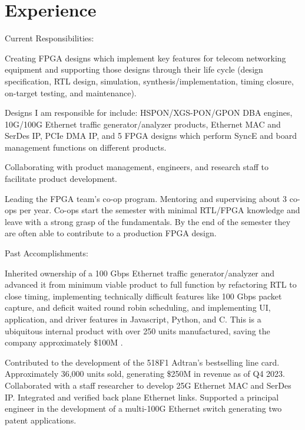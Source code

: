 \documentclass[10pt]{deedy-resume-reversed}
\begin{document}
\begin{minipage}[t]{1.0\textwidth}
\section{Experience}
Current Responsibilities:
\vspace{\topsep} %
\begin{tightemize}
\item Creating FPGA designs which implement key features for telecom networking equipment and 
supporting those designs through their life cycle (design specification, RTL design, simulation, 
synthesis/implementation, timing closure, on-target testing, and maintenance).
\item Designs I am responsible for include: HSPON/XGS-PON/GPON DBA engines, 
10G/100G Ethernet traffic generator/analyzer products, 
Ethernet MAC and SerDes IP, PCIe DMA IP, and 5 FPGA designs which perform SyncE and board management functions on different products.
\item Collaborating with product management, engineers, and research staff to facilitate product development.
\item Leading the FPGA team's co-op program. Mentoring and supervising about 3 co-ops per year. 
Co-ops start the semester with minimal RTL/FPGA knowledge and leave with a strong grasp of 
the fundamentals. By the end of the semester they are often able to contribute to a production FPGA design.
\end{tightemize}
Past Accomplishments:
\begin{tightemize}
\item Inherited ownership of a 100 Gbps Ethernet traffic generator/analyzer and advanced it from minimum viable product to full function by refactoring RTL to close timing, 
implementing technically difficult features like 100 Gbps packet capture, and deficit waited round robin scheduling, and implementing UI, application, 
and driver features in Javascript, Python, and C. This is a ubiquitous internal product with over 250 units manufactured, saving the company approximately \$100M .
\item Contributed to the development of the 518F1 Adtran’s bestselling line card. Approximately  36,000 units sold, generating \$250M in revenue as of Q4 2023. 
Collaborated with a staff researcher to develop 25G Ethernet MAC and SerDes IP.
Integrated and verified back plane Ethernet links.
Supported a principal engineer in the development of a multi-100G Ethernet switch generating two patent applications.

\end{tightemize}
\end{minipage}
\end{document}
